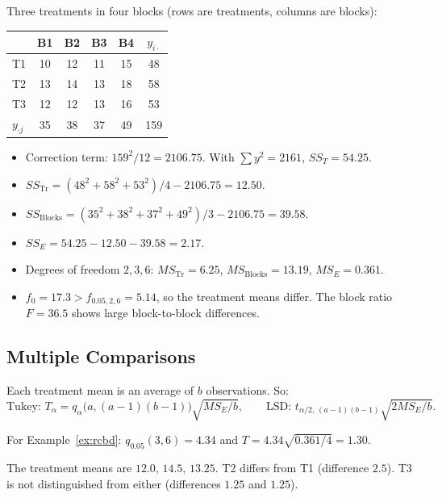 \begin{example}\label{ex:rcbd}
Three treatments in four blocks (rows are treatments, columns are blocks):
\begin{center}
\begin{tabular}{l cccc|c}
\toprule
 & B1 & B2 & B3 & B4 & $y_{i\cdot}$\\
\midrule
T1 & 10 & 12 & 11 & 15 & 48\\
T2 & 13 & 14 & 13 & 18 & 58\\
T3 & 12 & 12 & 13 & 16 & 53\\
\midrule
$y_{\cdot j}$ & 35 & 38 & 37 & 49 & 159\\
\bottomrule
\end{tabular}
\end{center}
\begin{itemize}
  \item Correction term: $159^2/12=2106.75$. With $\sum y^2=2161$, $SS_T=54.25$.
  \item $SS_{\mathrm{Tr}}=(48^2+58^2+53^2)/4-2106.75=12.50$.
  \item $SS_{\mathrm{Blocks}}=(35^2+38^2+37^2+49^2)/3-2106.75=39.58$.
  \item $SS_E=54.25-12.50-39.58=2.17$.
  \item Degrees of freedom $2,3,6$: $MS_{\mathrm{Tr}}=6.25$, $MS_{\mathrm{Blocks}}=13.19$, $MS_E=0.361$.
  \item $f_0=17.3>f_{0.05,2,6}=5.14$, so the treatment means differ. The block ratio $F=36.5$ shows large block-to-block differences.
\end{itemize}
\end{example}

\subsection{Multiple Comparisons}

Each treatment mean is an average of $b$ observations. So:
\[ \text{Tukey: }T_\alpha=q_\alpha\big(a,(a-1)(b-1)\big)\sqrt{MS_E/b},\qquad\text{LSD: }t_{\alpha/2,\,(a-1)(b-1)}\sqrt{2MS_E/b}. \]

\begin{example}
For Example~\ref{ex:rcbd}: $q_{0.05}(3,6)=4.34$ and $T=4.34\sqrt{0.361/4}=1.30$.

The treatment means are $12.0$, $14.5$, $13.25$. T2 differs from T1 (difference $2.5$). T3 is not distinguished from either (differences $1.25$ and $1.25$).
\end{example}

